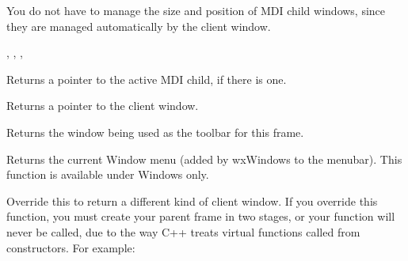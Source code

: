 You do not have to manage the size and position of MDI child windows, since they are managed
automatically by the client window.


,\rtfsp
{},\rtfsp
{},\rtfsp
{}



\label{wxmdiparentframegetactivechild}


Returns a pointer to the active MDI child, if there is one.

\label{wxmdiparentframegetclientwindow}


Returns a pointer to the client window.



\label{wxmdiparentframegettoolbar}


Returns the window being used as the toolbar for this frame.



\label{wxmdiparentframegetwindowmenu}


Returns the current Window menu (added by wxWindows to the menubar). This function
is available under Windows only.

\label{wxmdiparentframeoncreateclient}


Override this to return a different kind of client window. If you override this function,
you must create your parent frame in two stages, or your function will never be called,
due to the way C++ treats virtual functions called from constructors. For example:

